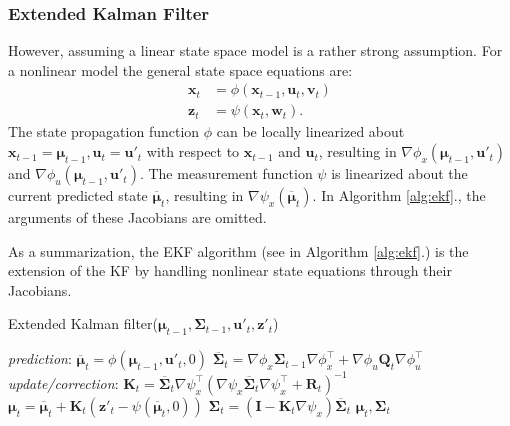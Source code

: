 \subsubsection{Extended Kalman Filter}
However, assuming a linear state space model is a rather strong assumption. For a nonlinear model the general state space equations are:
\begin{align}
    \mathbf{x}_t & = \phi(\mathbf{x}_{t-1},\mathbf{u}_t,\mathbf{v}_t) \label{eq:explicit-mot-eq} \\
    \mathbf{z}_t & = \psi(\mathbf{x}_t,\mathbf{w}_t).  \label{eq:explicit-meas-eq}
\end{align}
The state propagation function $\phi$ can be locally linearized about $\mathbf{x}_{t-1} = \boldsymbol{\mu}_{t-1}, \mathbf{u}_t = \mathbf{u}'_t$ with respect to $\mathbf{x}_{t-1}$ and $\mathbf{u}_t$, resulting in $\nabla \phi _x(\boldsymbol{\mu}_{t-1},\mathbf{u}'_t)$ and $\nabla \phi_u(\boldsymbol{\mu}_{t-1},\mathbf{u}'_t)$.
The measurement function $\psi$ is linearized about the current predicted state $\overline{\boldsymbol{\mu}}_t$,
resulting in $\nabla \psi_x(\overline{\boldsymbol{\mu}}_t)$.
In Algorithm \ref{alg:ekf}., the arguments of these Jacobians are omitted.

As a summarization, the EKF algorithm (see in Algorithm \ref{alg:ekf}.) is the extension of the KF by handling nonlinear state equations through their Jacobians.

\begin{algorithm}
    \caption{Extended Kalman filter($\boldsymbol{\mu}_{t-1},\mathbf{\Sigma}_{t-1},\mathbf{u}'_t,\mathbf{z}'_t$)}\label{alg:ekf}
    \begin{algorithmic}[1]
        \BState \emph{prediction}:
        \State\indent$\overline{\boldsymbol{\mu}}_t = \phi(\boldsymbol{\mu}_{t-1},\mathbf{u}'_t,0)$
        \State\indent $\overline{\mathbf{\Sigma}}_t = \nabla \phi_x\mathbf{\Sigma}_{t-1}\nabla \phi_x^{\top} +
            \nabla \phi _u\mathbf{Q}_t \nabla \phi_u^{\top}$
        \BState \emph{update/correction}:
        \State\indent $\mathbf{K}_t = \overline{\mathbf{\Sigma}}_t\nabla \psi_x^\top\left(\nabla \psi_x\overline{\mathbf{\Sigma}}_t\nabla \psi_x^\top+\mathbf{R}_t\right)^{-1}$ \label{alg:line:kalman-gain}
        \State\indent $\boldsymbol{\mu}_t = \overline{\boldsymbol{\mu}}_t + \mathbf{K}_t\left(\mathbf{z}'_t-\psi(\overline{\boldsymbol{\mu}}_t,0)\right)$ \label{alg:line:state-update}
        \State\indent $\mathbf{\Sigma}_t = \left(\mathbf{I}-\mathbf{K}_t\nabla \psi_x\right)\overline{\mathbf{\Sigma}}_t$
        \State\Return $\boldsymbol{\mu}_t,\mathbf{\Sigma}_t$
    \end{algorithmic}
\end{algorithm}

